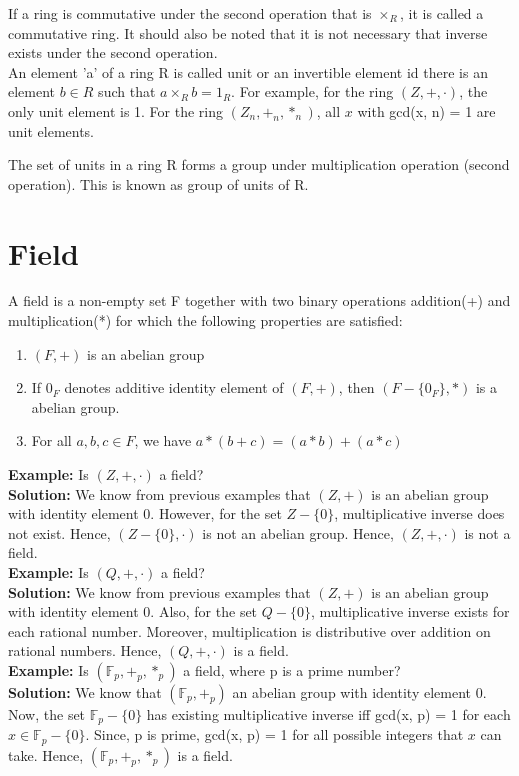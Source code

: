 \documentclass[11pt]{article}
\begin{document}
If a ring is commutative under the second operation that is $\times_R$, it is called a commutative ring. It should also be noted that it is not necessary that inverse exists under the second operation.\\

An element 'a' of a ring R is called unit or an invertible element id there is an element $b \in R$ such that $a \times_R b = 1_R$. For example, for the ring $(Z, +, \cdot)$, the only unit element is 1. For the ring $(Z_n, +_n, *_n)$, all $x$ with gcd(x, n) = 1 are unit elements.

The set of units in a ring R forms a group under multiplication operation (second operation). This is known as group of units of R.

\section{Field}
A field is a non-empty set F together with two binary operations addition(+) and multiplication(*) for which the following properties are satisfied:
\begin{enumerate}
    \item $(F, +)$ is an abelian group
    \item If $0_F$ denotes additive identity element of $(F, +)$, then $(F - \{0_F\}, *)$ is a abelian group.
    \item For all $a,b,c \in F$, we have $a * (b + c) = (a * b) + (a * c)$
\end{enumerate}

\textbf{Example:} Is $(Z, +, \cdot)$ a field?\\
\textbf{Solution:} We know from previous examples that $(Z, +)$ is an abelian group with identity element 0. However, for the set $Z - \{0\}$, multiplicative inverse does not exist. Hence, $(Z - \{0\}, \cdot)$ is not an abelian group. Hence, $(Z, +, \cdot)$ is not a field.\\

\textbf{Example:} Is $(Q, +, \cdot)$ a field?\\
\textbf{Solution:} We know from previous examples that $(Z, +)$ is an abelian group with identity element 0. Also, for the set $Q - \{0\}$, multiplicative inverse exists for each rational number. Moreover, multiplication is distributive over addition on rational numbers. Hence, $(Q, +, \cdot)$ is a field.\\

\textbf{Example:} Is $(\mathbb{F}_p, +_p, *_p)$ a field, where p is a prime number?\\
\textbf{Solution:} We know that $(\mathbb{F}_p, +_p)$ an abelian group with identity element 0. Now, the set $\mathbb{F}_p - \{0\}$ has existing multiplicative inverse iff gcd(x, p) = 1 for each $x \in \mathbb{F}_p - \{0\}$. Since, p is prime, gcd(x, p) = 1 for all possible integers that $x$ can take. Hence, $(\mathbb{F}_p, +_p, *_p)$ is a field.\\
\end{document}

